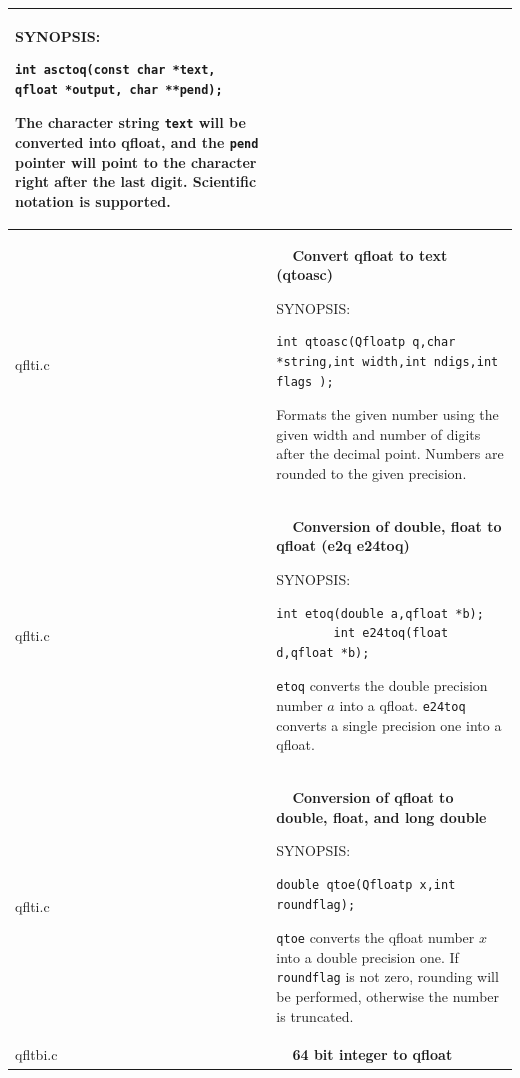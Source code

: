 \documentclass[10pt,a4paper,x11names]{memoir} %
\newcounter{entry}
\newcommand{\TOC}[1] {\addcontentsline{toc}{section}{\theentry\ \  #1} \textbf{\theentry\ \  #1} \par\stepcounter{entry}}
\begin{document}
\begin{longtable}{|p{1.5cm}|p{11.5cm}|}
	{\footnotesize SYNOPSIS:}\vspace{-0.2cm}
	\begin{lstlisting}[numbers=none]
		int asctoq(const char *text, qfloat *output, char **pend);
	\end{lstlisting}
	
	The character string \verb,text, will be converted into qfloat, and the \verb,pend, pointer will point to the character right after the last digit. Scientific notation is supported.
	
	\\\hline
	qflti.c& \TOC{Convert qfloat to text (qtoasc)}\index{qtoasc}
	
	{\footnotesize SYNOPSIS:}\vspace{-0.2cm}
	\begin{lstlisting}[numbers=none]
int qtoasc(Qfloatp q,char *string,int width,int ndigs,int flags );
	\end{lstlisting}\vspace{-0.2cm} \par
	
	Formats the given number using the given width and number of digits after the decimal point. Numbers are rounded to the given
	precision.
	\\\hline
	qflti.c&\TOC{Conversion of double, float to qfloat (e2q e24toq)}
	
	{\footnotesize SYNOPSIS:}\vspace{-0.2cm}\index{etoq}\index{e24toq}
	\begin{lstlisting}[numbers=none]
		int etoq(double a,qfloat *b);
		int e24toq(float d,qfloat *b);
	\end{lstlisting}\vspace{-0.2cm} \par
	\verb,etoq, converts the double precision number $a$ into a qfloat. \verb,e24toq, converts a single
	precision one into a qfloat.
	\\\hline
	qflti.c& \TOC{Conversion of qfloat to double, float, and long double}
	
	{\footnotesize SYNOPSIS:}\vspace{-0.2cm}\index{qtoe}
	\begin{lstlisting}[numbers=none]
		double qtoe(Qfloatp x,int roundflag);
	\end{lstlisting}\vspace{-0.2cm} \par
	
	\verb,qtoe, converts the qfloat number $x$ into a double precision one. If \verb,roundflag, is not zero, rounding will be performed,
	otherwise the number is truncated.
	\\\hline
	qfltbi.c&\TOC{64 bit integer to qfloat}
	

\end{longtable}
\end{document}

